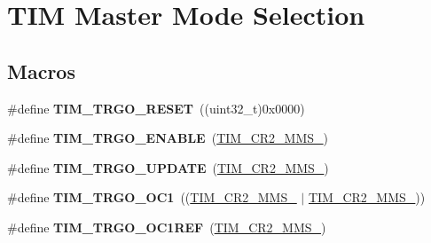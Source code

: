 \hypertarget{group___t_i_m___master___mode___selection}{}\section{T\+IM Master Mode Selection}
\label{group___t_i_m___master___mode___selection}
\subsection*{Macros}
\begin{DoxyCompactItemize}
\item 
\#define {\bfseries T\+I\+M\+\_\+\+T\+R\+G\+O\+\_\+\+R\+E\+S\+ET}~((uint32\+\_\+t)0x0000)\hypertarget{group___t_i_m___master___mode___selection_ga32a8e436f2c0818a657b0d3fcf4e872d}{}\label{group___t_i_m___master___mode___selection_ga32a8e436f2c0818a657b0d3fcf4e872d}

\item 
\#define {\bfseries T\+I\+M\+\_\+\+T\+R\+G\+O\+\_\+\+E\+N\+A\+B\+LE}~(\hyperlink{group___peripheral___registers___bits___definition_gaf3e55308e84106d6501201e66bd46ab6}{T\+I\+M\+\_\+\+C\+R2\+\_\+\+M\+M\+S\+\_})\hypertarget{group___t_i_m___master___mode___selection_ga4ac300b0fd24d1e6532e5961680a39a9}{}\label{group___t_i_m___master___mode___selection_ga4ac300b0fd24d1e6532e5961680a39a9}

\item 
\#define {\bfseries T\+I\+M\+\_\+\+T\+R\+G\+O\+\_\+\+U\+P\+D\+A\+TE}~(\hyperlink{group___peripheral___registers___bits___definition_ga4b1036929b0a4ba5bd5cced9b8e0f4c3}{T\+I\+M\+\_\+\+C\+R2\+\_\+\+M\+M\+S\+\_})\hypertarget{group___t_i_m___master___mode___selection_ga27521aebd507e562fe7fba6dfc639a67}{}\label{group___t_i_m___master___mode___selection_ga27521aebd507e562fe7fba6dfc639a67}

\item 
\#define {\bfseries T\+I\+M\+\_\+\+T\+R\+G\+O\+\_\+\+O\+C1}~((\hyperlink{group___peripheral___registers___bits___definition_ga4b1036929b0a4ba5bd5cced9b8e0f4c3}{T\+I\+M\+\_\+\+C\+R2\+\_\+\+M\+M\+S\+\_} $\vert$ \hyperlink{group___peripheral___registers___bits___definition_gaf3e55308e84106d6501201e66bd46ab6}{T\+I\+M\+\_\+\+C\+R2\+\_\+\+M\+M\+S\+\_}))\hypertarget{group___t_i_m___master___mode___selection_ga80aa9a9c41de509d99fc4cb492d6513f}{}\label{group___t_i_m___master___mode___selection_ga80aa9a9c41de509d99fc4cb492d6513f}

\item 
\#define {\bfseries T\+I\+M\+\_\+\+T\+R\+G\+O\+\_\+\+O\+C1\+R\+EF}~(\hyperlink{group___peripheral___registers___bits___definition_gacb74a815afdd856d51cfcf1ddf3fce6a}{T\+I\+M\+\_\+\+C\+R2\+\_\+\+M\+M\+S\+\_})\hypertarget{group___t_i_m___master___mode___selection_gaed715aa7ec4ad0f7f5d82dde6d964178}{}\label{group___t_i_m___master___mode___selection_gaed715aa7ec4ad0f7f5d82dde6d964178}


\end{DoxyCompactItemize}

